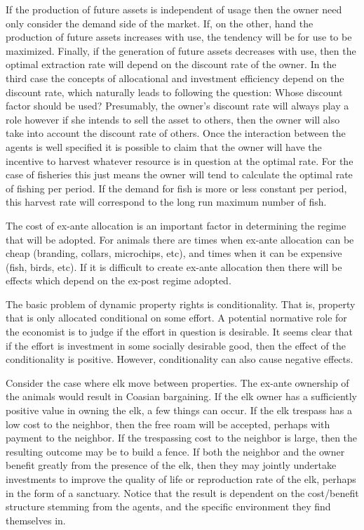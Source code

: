 If the production of future assets is independent of usage then the owner need only consider the demand side of the market. If, on the other, hand the production of future assets increases with use, the tendency will be for use to be maximized. Finally, if the generation of future assets decreases with use, then the optimal extraction rate will depend on the discount rate of the owner. In the third case the concepts of allocational and investment efficiency depend on the discount rate, which naturally leads to following the question: Whose discount factor should be used? Presumably, the owner's discount rate will always play a role however if she intends to sell the asset to others, then the owner will also take into account the discount rate of others. Once the interaction between the agents is well specified it is possible to claim that the owner will have the incentive to harvest whatever resource is in question at the optimal rate. For the case of fisheries this just means the owner will tend to calculate the optimal rate of fishing per period. If the demand for fish is more or less constant per period, this harvest rate will correspond to the long run maximum number of fish.

The cost of ex-ante allocation is an important factor in determining the regime that will be adopted. For animals there are times when ex-ante allocation can be cheap (branding, collars, microchips, etc), and times when it can be expensive (fish, birds, etc). If it is difficult to create ex-ante allocation then there will be effects which depend on the ex-post regime adopted.

The basic problem of dynamic property rights is conditionality. That is, property that is only allocated conditional on some effort. A potential normative role for the economist is to judge if the effort in question is desirable. It seems clear that if the effort is investment in some socially desirable good, then the effect of the conditionality is positive. However, conditionality can also cause negative effects. 

Consider the case where elk move between properties. The ex-ante ownership of the animals would result in Coasian bargaining. If the elk owner has a sufficiently positive value in owning the elk, a few things can occur. If the elk trespass has a low cost to the neighbor, then the free roam will be accepted, perhaps with payment to the neighbor. If the trespassing cost to the neighbor is large, then the resulting outcome may be to build a fence. If both the neighbor and the owner benefit greatly from the presence of the elk, then they may jointly undertake investments to improve the quality of life or reproduction rate of the elk, perhaps in the form of a sanctuary. Notice that the result is dependent on the cost/benefit structure stemming from the agents, and the specific environment they find themselves in. 

